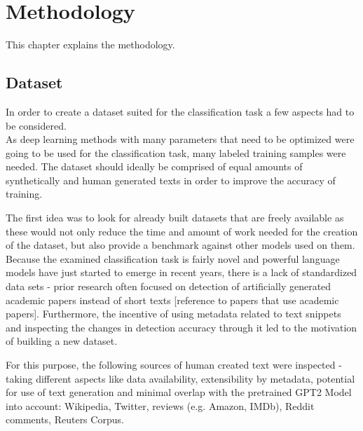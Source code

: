 \section{Methodology}
\label{ch:methodology}

This chapter explains the methodology.

\subsection{Dataset}
\label{sec:dataset}

In order to create a dataset suited for the classification task a few aspects had to be considered. \\
As deep learning methods with many parameters that need to be optimized were going to be used for the classification task, many labeled training samples were needed. The dataset should ideally be comprised of equal amounts of synthetically and human generated texts in order to improve the accuracy of training.

The first idea was to look for already built datasets that are freely available as these would not only reduce 
the time and amount of work needed for the creation of the dataset, but also provide a benchmark against other 
models used on them. Because the examined classification task is fairly novel and powerful language models have 
just started to emerge in recent years, there is a lack of standardized data sets - prior research 
often focused on detection of artificially generated academic papers instead of short texts 
[reference to papers that use academic papers]. Furthermore, the incentive of using metadata related to text 
snippets and inspecting the changes in detection accuracy through it led to the motivation of building a new dataset.

For this purpose, the following sources of human created text were inspected - taking different aspects like 
data availability, extensibility by metadata, potential for use of text generation and minimal overlap with the 
pretrained GPT2 Model into account: Wikipedia, Twitter, reviews (e.g. Amazon, IMDb), Reddit comments, Reuters Corpus.

